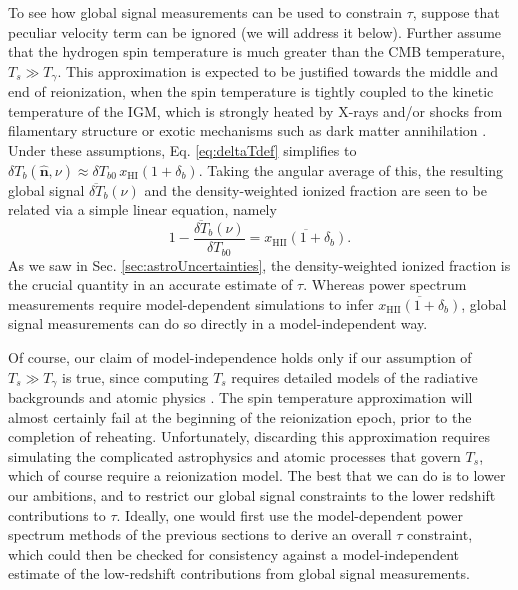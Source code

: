 \documentclass[twocolumn,aps,prd,nofootinbib,showpacs,superscriptaddress]{revtex4-1}
\begin{document}
To see how global signal measurements can be used to constrain $\tau$, suppose that peculiar velocity term can be ignored (we will address it below). Further assume that the hydrogen spin temperature is much greater than the CMB temperature, $T_s \gg T_\gamma$. This approximation is expected to be justified towards the middle and end of reionization, when the spin temperature is tightly coupled to the kinetic temperature of the IGM, which is strongly heated by X-rays and/or shocks from filamentary structure or exotic mechanisms such as dark matter annihilation \cite{gnedin_and_shaver2004,pritchard_and_loeb2010,mirabel_et_al2011,valdes_et_al2013,evoli_et_al2014}. Under these assumptions, Eq. \eqref{eq:deltaTdef} simplifies to $\delta T_b(\mathbf{\hat{n}}, \nu) \approx \delta T_{b0}\, x_\textrm{HI}  (1 + \delta_b)$. Taking the angular average of this, the resulting global signal $\overline{\delta T}_b (\nu)$ and the density-weighted ionized fraction are seen to be related via a simple linear equation, namely
\begin{equation}
\label{eq:globalSigDirect}
1- \frac{\overline{\delta T}_b (\nu)}{\delta T_{b0}} = \overline{x_\textrm{HII} (1+\delta_b)}.
\end{equation}
As we saw in Sec. \ref{sec:astroUncertainties}, the density-weighted ionized fraction is the crucial quantity in an accurate estimate of $\tau$. Whereas power spectrum measurements require model-dependent simulations to infer $\overline{x_\textrm{HII} (1+\delta_b)}$, global signal measurements can do so directly in a model-independent way.

Of course, our claim of model-independence holds only if our assumption of $T_s \gg T_\gamma$ is true, since computing $T_s$ requires detailed models of the radiative backgrounds and atomic physics \cite{hirata2006,hirata_and_sigurdson2007}. The spin temperature approximation will almost certainly fail at the beginning of the reionization epoch, prior to the completion of reheating. Unfortunately, discarding this approximation requires simulating the complicated astrophysics and atomic processes that govern $T_s$, which of course require a reionization model. The best that we can do is to lower our ambitions, and to restrict our global signal constraints to the lower redshift contributions to $\tau$. Ideally, one would first use the model-dependent power spectrum methods of the previous sections to derive an overall $\tau$ constraint, which could then be checked for consistency against a model-independent estimate of the low-redshift contributions from global signal measurements.
\end{document}
